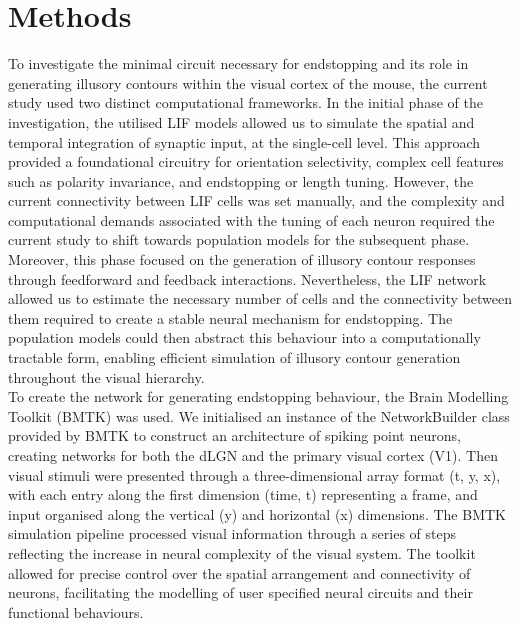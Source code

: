 \documentclass[12pt]{article}
\begin{document}
\section*{Methods}
To investigate the minimal circuit necessary for endstopping and its role in generating illusory contours within the visual cortex of the mouse, the current study used two distinct computational frameworks. In the initial phase of the investigation, the utilised LIF models allowed us to simulate the spatial and temporal integration of synaptic input, at the single-cell level. This approach provided a foundational circuitry for orientation selectivity, complex cell features such as polarity invariance, and endstopping or length tuning. However, the current connectivity between LIF cells was set manually, and the complexity and computational demands associated with the tuning of each neuron required the current study to shift towards population models for the subsequent phase. Moreover, this phase focused on the generation of illusory contour responses through feedforward and feedback interactions. Nevertheless, the LIF network allowed us to estimate the necessary number of cells and the connectivity between them required to create a stable neural mechanism for endstopping. The population models could then abstract this behaviour into a computationally tractable form, enabling efficient simulation of illusory contour generation throughout the visual hierarchy. 
\\
To create the network for generating endstopping behaviour, the Brain Modelling Toolkit (BMTK) was used. We initialised an instance of the NetworkBuilder class provided by BMTK to construct an architecture of spiking point neurons, creating networks for both the dLGN and the primary visual cortex (V1). Then visual stimuli were presented through a three-dimensional array format (t, y, x), with each entry along the first dimension (time, t) representing a frame, and input organised along the vertical (y) and horizontal (x) dimensions. The BMTK simulation pipeline processed visual information through a series of steps reflecting the increase in neural complexity of the visual system. The toolkit allowed for precise control over the spatial arrangement and connectivity of neurons, facilitating the modelling of user specified neural circuits and their functional behaviours. \\
\end{document}
